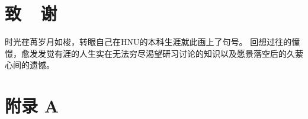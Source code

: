 
\section*{\hfill \xiaoer\hei 致~~谢\hfill}
时光荏苒岁月如梭，转眼自己在HNU的本科生涯就此画上了句号。
回想过往的憧憬，愈发发觉有涯的人生实在无法穷尽渴望研习讨论的知识以及愿景落空后的久萦心间的遗憾。



\clearpage

\section*{附录 A}